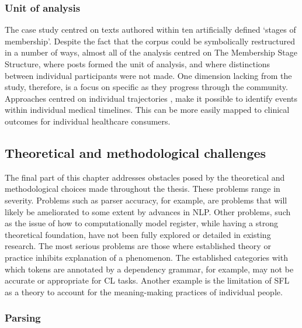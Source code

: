 \subsubsection*{Unit of analysis}

The case study centred on texts authored within ten artificially defined `stages of membership'. Despite the fact that the \gls{corpus} could be symbolically restructured in a number of ways, almost all of the analysis centred on The Membership Stage Structure, where \glspl{post} formed the unit of analysis, and where distinctions between individual participants were not made. One dimension lacking from the study, therefore, is a focus on specific  as they progress through the community. Approaches centred on individual  trajectories \cite[such as those proposed in][]{chancellor_recovery_2016,chancellor_this_2016,maclean_forum77:_2015}, make it possible to identify events within individual medical timelines. This can be more easily mapped to clinical outcomes for individual healthcare consumers.

\subsection{Theoretical and methodological challenges}

The final part of this chapter addresses obstacles posed by the theoretical and methodological choices made throughout the thesis. These problems range in severity. Problems such as parser accuracy, for example, are problems that will likely be ameliorated to some extent by advances in \gls{NLP}. Other problems, such as the issue of how to computationally model register, while having a strong theoretical foundation, have not been fully explored or detailed in existing research. The most serious problems are those where established theory or practice inhibits explanation of a phenomenon. The established categories with which tokens are annotated by a dependency grammar, for example, may not be accurate or appropriate for \gls{CL} tasks. Another example is the limitation of \gls{SFL} as a theory to account for the meaning\hyp{}making practices of individual people.

\subsubsection{Parsing}


